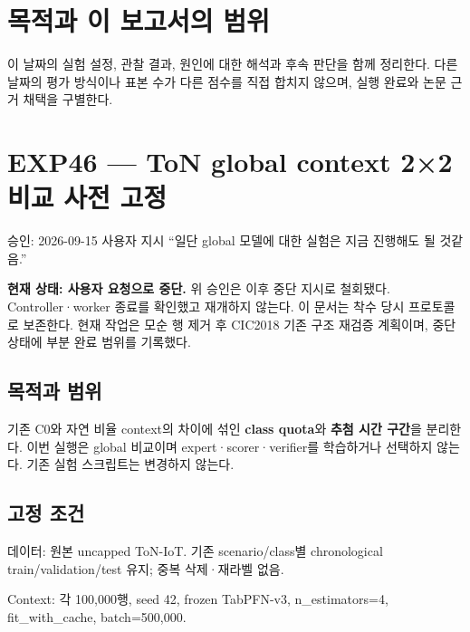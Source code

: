 




\section*{목적과 이 보고서의 범위}

이 날짜의 실험 설정, 관찰 결과, 원인에 대한 해석과 후속 판단을 함께 정리한다. 다른 날짜의 평가 방식이나 표본 수가 다른 점수를 직접 합치지 않으며, 실행 완료와 논문 근거 채택을 구별한다.


\section{EXP46 — ToN global context 2×2 비교 사전 고정}
승인: 2026-09-15 사용자 지시 “일단 global 모델에 대한 실험은 지금 진행해도 될 것같음.”

\textbf{현재 상태: 사용자 요청으로 중단.} 위 승인은 이후 중단 지시로 철회됐다. Controller·worker 종료를 확인했고 재개하지 않는다. 이 문서는 착수 당시 프로토콜로 보존한다. 현재 작업은 모순 행 제거 후 CIC2018 기존 구조 재검증 계획이며, 중단 상태에 부분 완료 범위를 기록했다.



\subsection{목적과 범위}
기존 C0와 자연 비율 context의 차이에 섞인 \textbf{class quota}와 \textbf{추첨 시간 구간}을 분리한다. 이번 실행은 global 비교이며 expert·scorer·verifier를 학습하거나 선택하지 않는다. 기존 실험 스크립트는 변경하지 않는다.

\subsection{고정 조건}
\par\noindent \textbullet\enspace 데이터: 원본 uncapped ToN-IoT. 기존 scenario/\allowbreak{}class별 chronological train/\allowbreak{}validation/\allowbreak{}test 유지; 중복 삭제·재라벨 없음.


\par\noindent \textbullet\enspace Context: 각 100,000행, seed 42, frozen TabPFN-v3, n\_\allowbreak{}estimators=\allowbreak{}4, fit\_\allowbreak{}with\_\allowbreak{}cache, batch=\allowbreak{}500,000.


